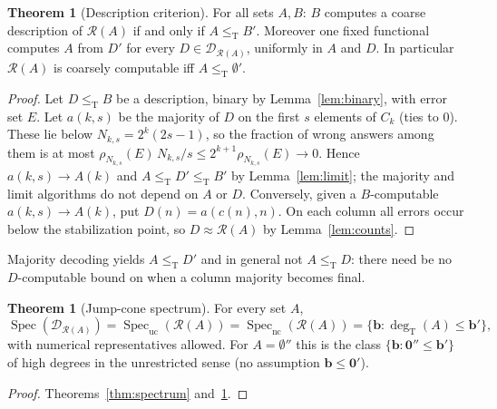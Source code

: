 \documentclass[11pt,letterpaper]{article}
\theoremstyle{definition}
\newtheorem{theorem}[definition]{Theorem}
\numberwithin{equation}{section}
\newcommand{\leT}{\le_{\mathrm T}}
\newcommand{\nc}{\mathrm{nc}}
\newcommand{\uc}{\mathrm{uc}}
\newcommand{\DX}[1]{\mathcal D_{#1}}
\newcommand{\Spec}{\operatorname{Spec}}
\newcommand{\degT}{\deg_{\mathrm T}}
\newcommand{\Rc}{\mathcal R}
\newcommand{\zero}{\mathbf 0}
\newcommand{\src}[1]{\leavevmode{\sffamily\footnotesize\color{Steel}[#1]}}
\begin{document}
\begin{theorem}[Description criterion]\label{thm:criterion}\src{R3, R4; unrelativized: \cite[Theorem~2.19]{JS}}
For all sets $A,B$: $B$ computes a coarse description of $\Rc(A)$ if and only if $A\leT B'$. Moreover one fixed functional computes $A$ from $D'$ for every $D\in\DX{\Rc(A)}$, uniformly in $A$ and $D$. In particular $\Rc(A)$ is coarsely computable iff $A\leT\emptyset'$.
\end{theorem}
\begin{proof}
Let $D\leT B$ be a description, binary by Lemma~\ref{lem:binary}, with error set $E$. Let $a(k,s)$ be the majority of $D$ on the first $s$ elements of $C_k$ (ties to $0$). These lie below $N_{k,s}=2^k(2s-1)$, so the fraction of wrong answers among them is at most $\rho_{N_{k,s}}(E)\,N_{k,s}/s\le2^{k+1}\rho_{N_{k,s}}(E)\to0$. Hence $a(k,s)\to A(k)$ and $A\leT D'\leT B'$ by Lemma~\ref{lem:limit}; the majority and limit algorithms do not depend on $A$ or $D$. Conversely, given a $B$-computable $a(k,s)\to A(k)$, put $D(n)=a(c(n),n)$. On each column all errors occur below the stabilization point, so $D\approx\Rc(A)$ by Lemma~\ref{lem:counts}.
\end{proof}
Majority decoding yields $A\leT D'$ and in general not $A\leT D$: there need be no $D$-computable bound on when a column majority becomes final.

\begin{theorem}[Jump-cone spectrum]\label{thm:jumpcone}\src{R3, R4}
For every set $A$,
\[
 \Spec(\DX{\Rc(A)})=\Spec_{\uc}(\Rc(A))=\Spec_{\nc}(\Rc(A))=\{\mathbf b:\degT(A)\le\mathbf b'\},
\]
with numerical representatives allowed. For $A=\emptyset''$ this is the class $\{\mathbf b:\zero''\le\mathbf b'\}$ of high degrees in the unrestricted sense (no assumption $\mathbf b\le\zero'$).
\end{theorem}
\begin{proof}
Theorems~\ref{thm:spectrum} and~\ref{thm:criterion}.
\end{proof}
\end{document}
